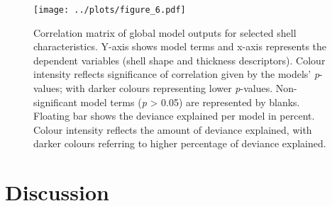 \documentclass[smallextended]{svjour3}       %
\begin{document}
\begin{figure}
\centering
\texttt{[image: ../plots/figure\_6.pdf]}
\caption{Correlation matrix of global model outputs for selected shell
characteristics. Y-axis shows model terms and x-axis represents the
dependent variables (shell shape and thickness descriptors). Colour
intensity reflects significance of correlation given by the models'
\emph{p}-values; with darker colours representing lower \emph{p}-values.
Non-significant model terms (\emph{p} \textgreater{} 0.05) are
represented by blanks. Floating bar shows the deviance explained per
model in percent. Colour intensity reflects the amount of deviance
explained, with darker colours referring to higher percentage of
deviance explained.}
\end{figure}

\hypertarget{discussion}{%
\section{Discussion}\label{discussion}}
\end{document}
